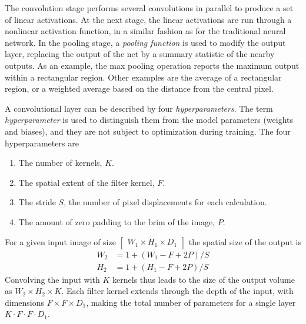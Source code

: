 The convolution stage performs several convolutions in parallel to produce a set of linear activations. At the next stage, the linear activations are run through a nonlinear activation function, in a similar fashion as for the traditional neural network. In the pooling stage, a \textit{pooling function} is used to modify the output layer, replacing the output of the net by a summary statistic of the nearby outputs. As an example, the max pooling operation reports the maximum output within a rectangular region. Other examples are the average of a rectangular region, or a weighted average based on the distance from the central pixel.

A convolutional layer can be described by four \textit{hyperparameters}. The term \textit{hyperparameter} is used to distinguish them from the model parameters (weights and biases), and they are not subject to optimization during training. The four hyperparameters are
\begin{enumerate}
	\item The number of kernels, $K$.
	\item The spatial extent of the filter kernel, $F$.
	\item The stride $S$, the number of pixel displacements for each calculation.
	\item The amount of zero padding to the brim of the image, $P$.
\end{enumerate}
For a given input image of size $\begin{bmatrix}
W_1\times H_1\times D_1
\end{bmatrix}$ the spatial size of the output is 
\begin{equation}
\begin{split}
W_2&=1+(W_1-F+2P)/S\\
H_2&=1+(H_1-F+2P)/S
\end{split}
\end{equation}
Convolving the input with $K$ kernels thus leads to the size of the output volume as $
W_2\times H_2\times K$. Each filter kernel extends through the depth of the input, with dimensions $F\times F\times D_1$, making the total number of parameters for a single layer $K\cdot F\cdot F\cdot D_1$.
